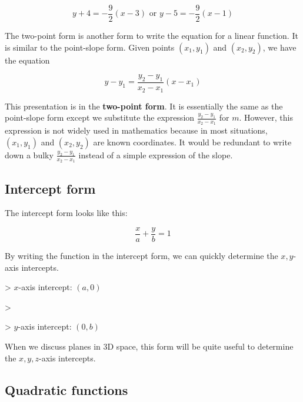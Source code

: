$$y+4=-\frac{9}{2}(x-3)\text{ or }y-5=-\frac{9}{2}(x-1)$$



The two-point form is another form to write the equation for a linear function. It is
similar to the point-slope form. Given points $(x _1,y _1)$ and $(x _2,y _2)$, we have the
equation



$$y-y _1=\frac{y _2-y _1}{x _2-x _1}(x-x _1)$$



This presentation is in the \textbf{two-point form}. It is essentially the same as the
point-slope form except we substitute the expression $\frac{y _2-y _1}{x _2-x _1}$ for
$m$. However, this expression is not widely used in mathematics because in most
situations, $(x _1,y _1)$ and $(x _2,y _2)$ are known coordinates. It would be redundant
to write down a bulky $\frac{y _2-y _1}{x _2-x _1}$ instead of a simple expression of the
slope.




\subsection{Intercept form}
\label{sss:inte-1b2b}




The intercept form looks like this:



$$\frac{x}{a}+\frac{y}{b}=1$$



By writing the function in the intercept form, we can quickly determine the $x,y$-axis intercepts.



> $x$-axis intercept: $(a,0)$

>

> $y$-axis intercept: $(0,b)$



When we discuss planes in 3D space, this form will be quite useful to determine the
$x,y,z$-axis intercepts.




\subsection{Quadratic functions}
\label{sss:quad-e70d}




